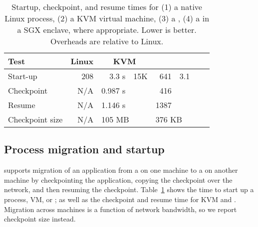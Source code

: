 

\begin{table}[t!b!]
\footnotesize
\centering
\begin{tabular}{|l|r|rr|rr|rr|}
\hline
{\bf Test } & {\bf Linux } & \multicolumn{2}{c|}{{\bf KVM}}
& \multicolumn{2}{c|}{{\bf \graphene{}}} \\\hline

Start-up   & 208 \us{} & 3.3 s & 15K\x{} & 641 \us{} & 3.1\x{}  \\
\hline
Checkpoint & N/A   & 0.987 s  &  &   416 \us{} &  \\
\hline
Resume     & N/A   & 1.146 s  &  &  1387 \us{} & \\
\hline\hline
Checkpoint size & N/A & \multicolumn{2}{l|}{105 MB} & \multicolumn{2}{l|}{376 KB}   \\
\hline
\end{tabular}
\caption[Startup, checkpoint, and resume times in Linux, KVM, and \graphene{}]
{Startup, checkpoint, and resume times for (1) a native Linux process,
(2) a KVM virtual machine,
(3) a \graphene{} \picoproc{},
(4) a \graphene{} \picoproc{} in a SGX enclave,
 where appropriate. Lower is better.  
Overheads are relative to Linux.} 
\label{tab:graphene:startup}
\end{table}

\subsection{Process migration and startup}
\label{sec:eval:graphene:startup}

\graphene{} supports migration of an application from a \picoproc{} on one machine
to a \picoproc{} on another machine by checkpointing the application,
copying the checkpoint over the network, and then resuming the checkpoint.
Table~\ref{tab:graphene:startup} shows the time to start
up a process, VM, or \picoproc{}; as well as the checkpoint and resume time for KVM and \graphene{}.
Migration across machines is a function of network bandwidth,
so we report checkpoint size instead. %


